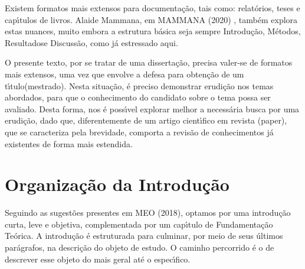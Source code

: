 \documentclass[
12pt,		%
openright,	%
twoside,  %
a4paper,			%
chapter=TITLE,		%
english,			%
french,				%
spanish,			%
brazil				%
]{USPSC-classe/USPSC_RedarTex}
\begin{document}
Existem formatos mais extensos para documenta\c{c}\~ao, tais como: relat\'orios, teses e cap\'{\i}tulos de livros. Alaide Mammana, em  MAMMANA (2020) , tamb\'em explora estas nuances, muito embora a estrutura b\'asica seja sempre \textquotedbl Introdu\c{c}\~ao\textquotedbl , \textquotedbl M\'etodos\textquotedbl , \textquotedbl Resultados\textquotedbl  e \textquotedbl Discuss\~ao\textquotedbl , como j\'a estressado aqui.








O presente texto, por se tratar de uma disserta\c{c}\~ao, precisa valer-se de formatos mais extensos, uma vez que envolve a \textquotedbl defesa para obten\c{c}\~ao de um t\'{\i}tulo\textquotedbl  (mestrado). Nesta situa\c{c}\~ao, \'e preciso demonstrar erudi\c{c}\~ao nos temas abordados, para que o conhecimento do candidato sobre o tema possa ser avaliado. Desta forma, nos \'e poss\'{\i}vel explorar melhor a necess\'aria busca por uma erudi\c{c}\~ao, dado que, diferentemente de um artigo cient\'{\i}fico em revista (\textquotedbl paper\textquotedbl ), que se caracteriza pela brevidade,  comporta a revis\~ao de conhecimentos j\'a existentes de forma mais estendida.








\section[Organiza\c{c}\~ao da Introdu\c{c}\~ao]{Organiza\c{c}\~ao da Introdu\c{c}\~ao}\label{Organiza\c{c}\~ao da Introdu\c{c}\~ao}
Seguindo as sugest\~oes presentes em MEO (2018), optamos por uma introdu\c{c}\~ao curta, leve e objetiva, complementada por um cap\'{\i}tulo de \textquotedbl Fundamenta\c{c}\~ao Te\'orica\textquotedbl . A introdu\c{c}\~ao \'e estruturada para culminar, por meio de seus \'ultimos par\'agrafos, na descri\c{c}\~ao do objeto de estudo. O caminho percorrido \'e o de descrever esse objeto do mais geral at\'e o espec\'{\i}fico.
\end{document}
